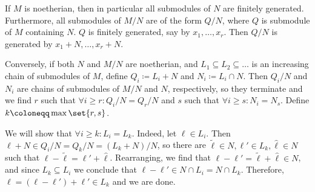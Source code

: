 If $M$ is noetherian, then in particular all submodules of $N$ are finitely generated.
Furthermore, all submodules of $M/N$ are of the form $Q/N$, where $Q$ is submodule of
$M$ containing $N$. $Q$ is finitely generated, say by $x_1, \ldots, x_r$. Then
$Q/N$ is generated by $x_1 + N, \ldots, x_r + N$.

Conversely, if both $N$ and $M/N$ are noetherian, and $L_1 \subseteq L_2 \subseteq \ldots$
is an increasing chain of submodules of $M$, define $Q_i \coloneqq L_i + N$ and
$N_i \coloneqq L_i\cap N$. Then $Q_i/N$ and $N_i$ are chains of submodules of
$M/N$ and $N$, respectively, so they terminate and we find $r$ such that
$\forall i\geq r\colon Q_i/N = Q_r/N$ and $s$ such that $\forall i\geq s\colon N_i = N_s$.
Define $k\coloneqq \max\set{r, s}$.

We will show that $\forall i\geq k\colon L_i = L_k$. Indeed, let $\ell \in L_i$.
Then $\ell + N \in Q_i/N = Q_k/N = (L_k + N)/N$, so there are $\tilde{\ell} \in N, \ell' \in L_k, \hat{\ell} \in N$
such that $\ell - \tilde{\ell} = \ell' + \hat{\ell}$. Rearranging, we find that
$\ell - \ell' = \tilde{\ell} + \hat{\ell} \in N$, and since $L_k \subseteq L_i$ we
conclude that $\ell - \ell' \in N \cap L_i = N \cap L_k$. Therefore,
$\ell = (\ell - \ell') + \ell' \in L_k$ and we are done.
